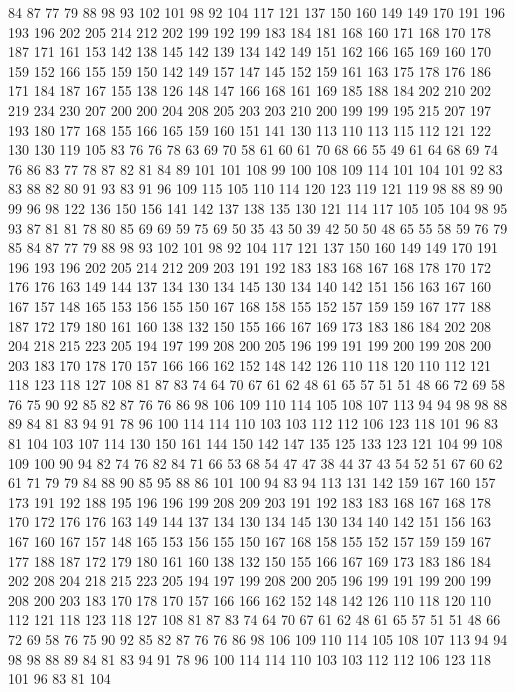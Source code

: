 84 87 77 79 88 98 93 102 101 98 92 104 117 121 137 150 160 149 149 170
191 196 193 196 202 205 214 212 202 199 192 199 183 184 181 168 160 171 168 170
178 187 171 161 153 142 138 145 142 139 134 142 149 151 162 166 165 169 160 170
159 152 166 155 159 150 142 149 157 147 145 152 159 161 163 175 178 176 186 171
184 187 167 155 138 126 148 147 166 168 161 169 185 188 184 202 210 202 219 234
230 207 200 200 204 208 205 203 203 210 200 199 199 195 215 207 197 193 180 177
168 155 166 165 159 160 151 141 130 113 110 113 115 112 121 122 130 130 119 105
83 76 76 78 63 69 70 58 61 60 61 70 68 66 55 49 61 64 68 69
74 76 86 83 77 78 87 82 81 84 89 101 101 108 99 100 108 109 114 101
104 101 92 83 83 88 82 80 91 93 83 91 96 109 115 105 110 114 120 123
119 121 119 98 88 89 90 99 96 98 122 136 150 156 141 142 137 138 135 130
121 114 117 105 105 104 98 95 93 87 81 81 78 80 85 69 69 59 75 69
50 35 43 50 39 42 50 50 48 65 55 58 59 76 79 85 84 87 77 79
88 98 93 102 101 98 92 104 117 121 137 150 160 149 149 170 191 196 193 196
202 205 214 212 209 203 191 192 183 183 168 167 168 178 170 172 176 176 163 149
144 137 134 130 134 145 130 134 140 142 151 156 163 167 160 167 157 148 165 153
156 155 150 167 168 158 155 152 157 159 159 167 177 188 187 172 179 180 161 160
138 132 150 155 166 167 169 173 183 186 184 202 208 204 218 215 223 205 194 197
199 208 200 205 196 199 191 199 200 199 208 200 203 183 170 178 170 157 166 166
162 152 148 142 126 110 118 120 110 112 121 118 123 118 127 108 81 87 83 74
64 70 67 61 62 48 61 65 57 51 51 48 66 72 69 58 76 75 90 92
85 82 87 76 76 86 98 106 109 110 114 105 108 107 113 94 94 98 98 88
89 84 81 83 94 91 78 96 100 114 114 110 103 103 112 112 106 123 118 101
96 83 81 104 103 107 114 130 150 161 144 150 142 147 135 125 133 123 121 104
99 108 109 100 90 94 82 74 76 82 84 71 66 53 68 54 47 47 38 44
37 43 54 52 51 67 60 62 61 71 79 79 84 88 90 85 95 88 86 101
100 94 83 94 113 131 142 159 167 160 157 173 191 192 188 195 196 196 199 208
209 203 191 192 183 183 168 167 168 178 170 172 176 176 163 149 144 137 134 130
134 145 130 134 140 142 151 156 163 167 160 167 157 148 165 153 156 155 150 167
168 158 155 152 157 159 159 167 177 188 187 172 179 180 161 160 138 132 150 155
166 167 169 173 183 186 184 202 208 204 218 215 223 205 194 197 199 208 200 205
196 199 191 199 200 199 208 200 203 183 170 178 170 157 166 166 162 152 148 142
126 110 118 120 110 112 121 118 123 118 127 108 81 87 83 74 64 70 67 61
62 48 61 65 57 51 51 48 66 72 69 58 76 75 90 92 85 82 87 76
76 86 98 106 109 110 114 105 108 107 113 94 94 98 98 88 89 84 81 83
94 91 78 96 100 114 114 110 103 103 112 112 106 123 118 101 96 83 81 104
